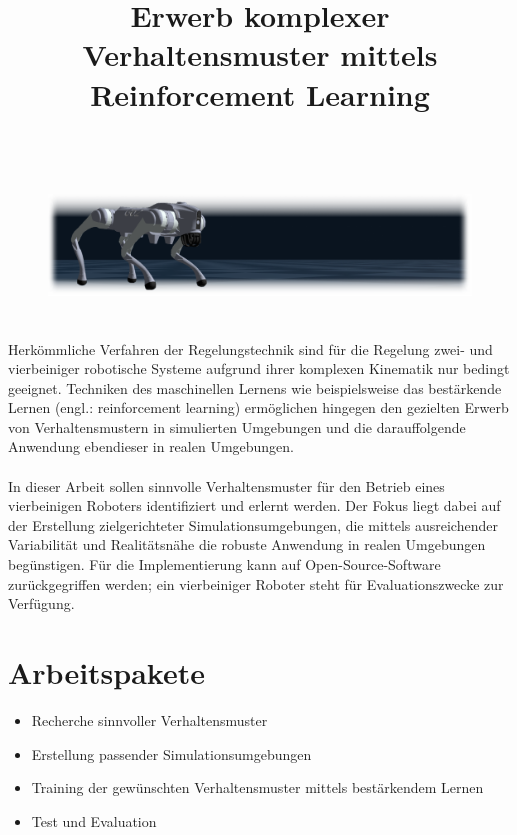 \documentclass[a4paper,11pt]{article}
\title{\textcolor{ohm_red}{Erwerb komplexer Verhaltensmuster mittels Reinforcement Learning}}
\date{}
\begin{document}
\maketitle
\thispagestyle{fancy}

\vspace*{-3cm}
\begin{figure}[h!]
    \centering
    \includegraphics[height=4cm]{img/roboterhund.png}
\end{figure}

Herkömmliche Verfahren der Regelungstechnik sind für die Regelung zwei- und vierbeiniger robotische Systeme aufgrund ihrer komplexen Kinematik nur bedingt geeignet.
Techniken des maschinellen Lernens wie beispielsweise das bestärkende Lernen (engl.: reinforcement learning) ermöglichen hingegen den gezielten Erwerb von Verhaltensmustern in simulierten Umgebungen und die darauffolgende Anwendung ebendieser in realen Umgebungen.\\\\
In dieser Arbeit sollen sinnvolle Verhaltensmuster für den Betrieb eines vierbeinigen Roboters identifiziert und erlernt werden. Der Fokus liegt dabei auf der Erstellung zielgerichteter Simulationsumgebungen, die mittels ausreichender Variabilität und Realitätsnähe die robuste Anwendung in realen Umgebungen begünstigen.
Für die Implementierung kann auf Open-Source-Software zurückgegriffen werden; ein vierbeiniger Roboter steht für Evaluationszwecke zur Verfügung.


\section*{Arbeitspakete}
\begin{itemize}[leftmargin=0.5cm]
    \item Recherche sinnvoller Verhaltensmuster
    \item Erstellung passender Simulationsumgebungen
    \item Training der gewünschten Verhaltensmuster mittels bestärkendem Lernen
    \item Test und Evaluation 
\end{itemize}
\end{document}
